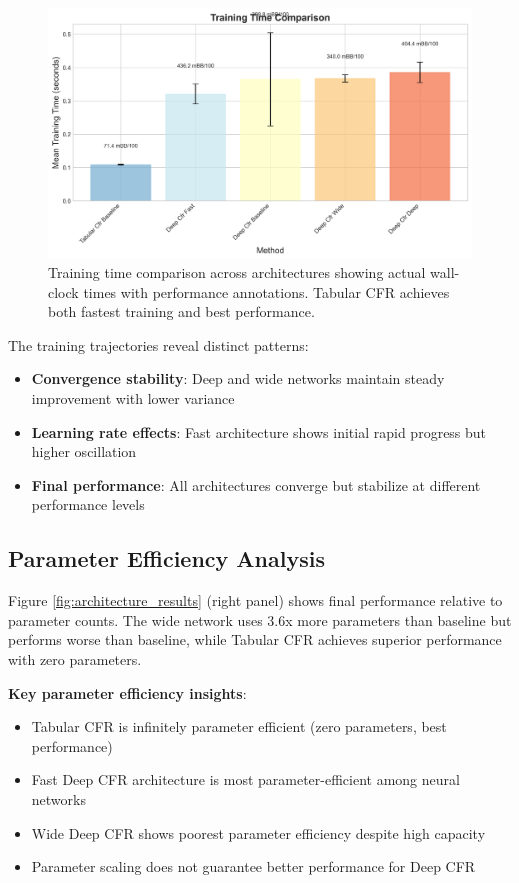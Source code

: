 \documentclass{article}
\begin{document}
\begin{figure}[t]
\centering
\includegraphics[width=\textwidth]{plots/training_time_comparison}
\caption{Training time comparison across architectures showing actual wall-clock times with performance annotations. Tabular CFR achieves both fastest training and best performance.}
\label{fig:loss_curves}
\end{figure}

The training trajectories reveal distinct patterns:

\begin{itemize}
\item \textbf{Convergence stability}: Deep and wide networks maintain steady improvement with lower variance
\item \textbf{Learning rate effects}: Fast architecture shows initial rapid progress but higher oscillation
\item \textbf{Final performance}: All architectures converge but stabilize at different performance levels
\end{itemize}

\subsection{Parameter Efficiency Analysis}

Figure \ref{fig:architecture_results} (right panel) shows final performance relative to parameter counts. The wide network uses 3.6x more parameters than baseline but performs worse than baseline, while Tabular CFR achieves superior performance with zero parameters.

\textbf{Key parameter efficiency insights}:
\begin{itemize}
\item Tabular CFR is infinitely parameter efficient (zero parameters, best performance)
\item Fast Deep CFR architecture is most parameter-efficient among neural networks
\item Wide Deep CFR shows poorest parameter efficiency despite high capacity
\item Parameter scaling does not guarantee better performance for Deep CFR
\end{itemize}
\end{document}
